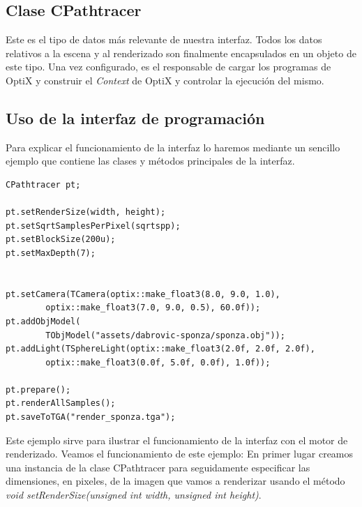 \subsection{Clase CPathtracer}

Este es el tipo de datos más relevante de nuestra interfaz. Todos los datos relativos a la escena y al renderizado son finalmente encapsulados en un objeto de este tipo. Una vez configurado, es el responsable de cargar los programas de OptiX y construir el \emph{Context} de OptiX y controlar la ejecución del mismo.

\subsection{Uso de la interfaz de programación}

Para explicar el funcionamiento de la interfaz lo haremos mediante un sencillo ejemplo que contiene las clases y métodos principales de la interfaz.




\lstset{style=customc}

\begin{lstlisting}
CPathtracer pt;

pt.setRenderSize(width, height);
pt.setSqrtSamplesPerPixel(sqrtspp);
pt.setBlockSize(200u);
pt.setMaxDepth(7);


pt.setCamera(TCamera(optix::make_float3(8.0, 9.0, 1.0), 
		optix::make_float3(7.0, 9.0, 0.5), 60.0f));
pt.addObjModel(
		TObjModel("assets/dabrovic-sponza/sponza.obj"));
pt.addLight(TSphereLight(optix::make_float3(2.0f, 2.0f, 2.0f),
		optix::make_float3(0.0f, 5.0f, 0.0f), 1.0f));

pt.prepare();
pt.renderAllSamples();
pt.saveToTGA("render_sponza.tga");
\end{lstlisting}

Este ejemplo sirve para ilustrar el funcionamiento de la interfaz con el motor de renderizado.
Veamos el funcionamiento de este ejemplo:
En primer lugar creamos una instancia de la clase CPathtracer para seguidamente especificar las dimensiones, en pixeles, de la imagen que vamos a renderizar usando el método \emph{void setRenderSize(unsigned int width, unsigned int height)}. 

